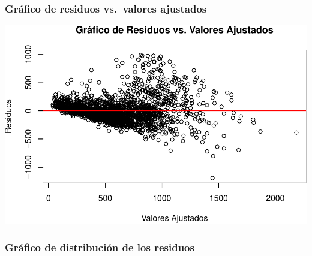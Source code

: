\documentclass[
]{article}
\begin{document}
\subsubsection{\texorpdfstring{\textbf{Gráfico de residuos vs.~valores
ajustados}}{Gráfico de residuos vs.~valores ajustados}}\label{gruxe1fico-de-residuos-vs.-valores-ajustados}

\includegraphics{A2_U2_InformeEjecutivo_files/figure-latex/unnamed-chunk-17-1.pdf}

\subsubsection{\texorpdfstring{\textbf{Gráfico de distribución de los
residuos}}{Gráfico de distribución de los residuos}}\label{gruxe1fico-de-distribuciuxf3n-de-los-residuos}
\end{document}
